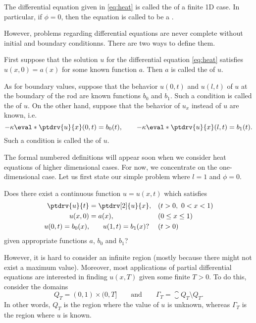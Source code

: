 \begin{definition*}
    \label{def*:heat}
    The differential equation given in \eqref{eq:heat}
    is called the  of a finite 1D case.
    In particular, if \(\phi=0\),
    then the equation is called to be
    a .
\end{definition*}

However, problems regarding differential equations
are never complete without initial and boundary conditionns.
There are two ways to define them.

\begin{definition*}
    \label{def*:IBVP}
    First suppose that
    the solution \(u\) for the differential equation
    \eqref{eq:heat} satisfies \(u(x,0)=a(x)\)
    for some known function \(a\).
    Then \(a\) is called the  of \(u\).

    As for boundary values, suppose that
    the behavior \(u(0,t)\) and \(u(l,t)\) of \(u\)
    at the boundary of the rod are known functions \(b_0\) and \(b_1\).
    Such a condition is called
    the  of \(u\).
    On the other hand,
    suppose that the behavior of \(u_x\) instead of \(u\) are known,
    i.e.
    \[
        -\kappa\eval*{\ptdrv{u}{x}}{(0,t)}=b_0(t),
        \qquad
        -\kappa\eval*{\ptdrv{u}{x}}{(l,t)}=b_1(t).
    \]
    Such a condition is called
    the  of \(u\).
\end{definition*}

The formal numbered definitions will appear soon
when we consider heat equations of higher dimensional cases.
For now, we concentrate on the one-dimensional case.
Let us first state our simple problem
where \(l=1\) and \(\phi=0\).

\begin{question}
    \label{qst:homo1dheat}
    Does there exist a continuous function \(u=u(x,t)\)
    which satisfies
    \begin{align}
        \ptdrv{u}{t}&=\ptdrv[2]{u}{x},
        && (t>0,\ 0<x<1) \\
        u(x,0)&=a(x),
        && (0\le x\le 1) \\
        u(0,t)=b_0(x),
        &\qquad
        u(1,t)=b_1(x)?
        && (t>0)
    \end{align}
    given appropriate functions \(a\), \(b_0\) and \(b_1\)?
\end{question}

However, it is hard to consider an infinite region
(mostly because there might not exist a maximum value).
Moreover, most applications of partial differential equations
are interested in finding \(u(x,T)\) given some finite \(T>0\).
To do this, consider the domains
\[
    Q_T=(0,1)\times(0,T]
    \qquad\text{and}\qquad
    \Gamma_T=\closure{Q_T}\setminus Q_T.
\]
In other words,
\(Q_T\) is the region where the value of \(u\) is unknown,
whereas \(\Gamma_T\) is the region where \(u\) is known.